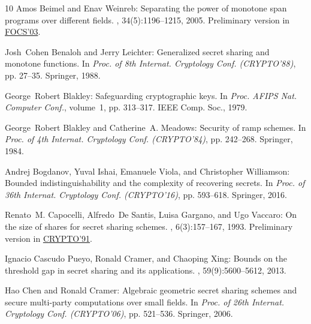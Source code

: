 \documentclass[11pt]{article}
\numberwithin{equation}{section}
\theoremstyle{definition}
\theoremstyle{plain}
\begin{document}
\begin{thebibliography}{10}
{\sc Amos Beimel and Enav Weinreb}: Separating the power of monotone span
  programs over different fields.
, 34(5):1196--1215, 2005.
\newblock Preliminary version in
  \href{https://doi.org/10.1109/SFCS.2003.1238216}{FOCS'03}.
\newblock [\epfmtdoi{10.1137/S0097539704444038}]

{\sc Josh~Cohen Benaloh and Jerry Leichter}: Generalized secret sharing and
  monotone functions.
\newblock In {\em Proc. of 8th Internat. Cryptology Conf. (CRYPTO'88)}, pp.
  27--35. Springer, 1988.
\newblock [\epfmtdoi{10.1007/0-387-34799-2\_3}]

{\sc George~Robert Blakley}: Safeguarding cryptographic keys.
\newblock In {\em Proc. AFIPS Nat. Computer Conf.}, volume~1, pp. 313--317.
  IEEE Comp. Soc., 1979.

{\sc George~Robert Blakley and Catherine~A. Meadows}: Security of ramp schemes.
\newblock In {\em Proc. of 4th Internat. Cryptology Conf. (CRYPTO'84)}, pp.
  242--268. Springer, 1984.
\newblock [\epfmtdoi{10.1007/3-540-39568-7\_20}]

{\sc Andrej Bogdanov, Yuval Ishai, Emanuele Viola, and Christopher Williamson}:
  Bounded indistinguishability and the complexity of recovering secrets.
\newblock In {\em Proc. of 36th Internat. Cryptology Conf. (CRYPTO'16)}, pp.
  593--618. Springer, 2016.
\newblock [\epfmtdoi{10.1007/978-3-662-53015-3\_21}]

{\sc Renato~M. Capocelli, Alfredo~De Santis, Luisa Gargano, and Ugo Vaccaro}:
  On the size of shares for secret sharing schemes.
, 6(3):157--167, 1993.
\newblock Preliminary version in
  \href{http://doi.org/10.1007/3-540-46766-1\_7}{CRYPTO'91}.
\newblock [\epfmtdoi{10.1007/BF00198463}]

{\sc Ignacio {Cascudo Pueyo}, Ronald Cramer, and Chaoping Xing}: Bounds on the
  threshold gap in secret sharing and its applications.
, 59(9):5600--5612, 2013.

{\sc Hao Chen and Ronald Cramer}: Algebraic geometric secret sharing schemes
  and secure multi-party computations over small fields.
\newblock In {\em Proc. of 26th Internat. Cryptology Conf. (CRYPTO'06)}, pp.
  521--536. Springer, 2006.
\newblock [\epfmtdoi{10.1007/11818175\_31}]


\end{thebibliography}
\end{document}
